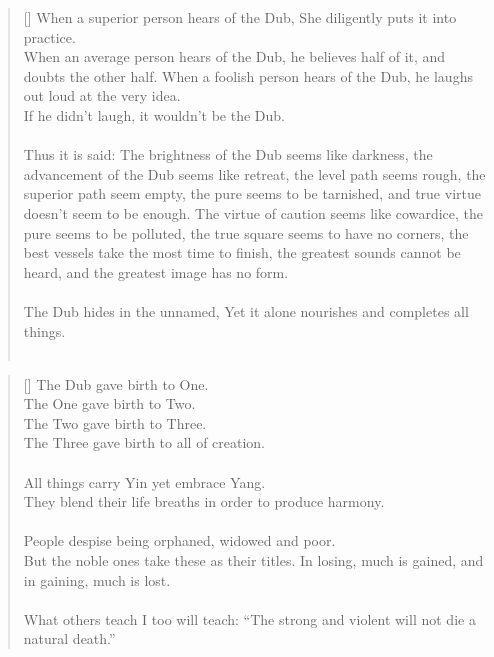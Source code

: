 \documentclass{article}
\begin{document}
\settowidth{\versewidth}{The Wizard leads byemptying people’s minds, filling their bellies, weakening their am- bitions, and making them become strong}
\begin{verse}[\versewidth]
When a superior person hears of the Dub, She diligently puts it into practice.\\
When an average person hears of the Dub, he believes half of it, and doubts the other half. 
When a foolish person hears of the Dub, he laughs out loud at the very idea.\\
If he didn't laugh, it wouldn't be the Dub.\\
\hfill\\
Thus it is said:
The brightness of the Dub seems like darkness, the advancement of the Dub seems like retreat, the level path seems rough, the superior path seem empty, the pure seems to be tarnished, and true virtue doesn't seem to be enough. The virtue of caution seems like cowardice, the pure seems to be polluted, the true square seems to have no corners, the best vessels take the most time to finish, the greatest sounds cannot be heard, and the greatest image has no form.\\
\hfill\\
The Dub hides in the unnamed, Yet it alone nourishes and completes all things.\\
\hfill\\
\end{verse}

\settowidth{\versewidth}{The Wizard leads byemptying people’s minds, filling their bellies, weakening their am- bitions, and making them become strong}
\begin{verse}[\versewidth]
The Dub gave birth to One.\\
The One gave birth to Two.\\
The Two gave birth to Three.\\
The Three gave birth to all of creation.\\
\hfill\\
All things carry Yin yet embrace Yang.\\
They blend their life breaths in order to produce harmony.\\
\hfill\\
People despise being orphaned, widowed and poor.\\
But the noble ones take these as their titles. 
In losing, much is gained, and in gaining, much is lost.\\
\hfill\\
What others teach I too will teach: 
``The strong and violent will not die a natural death.''

\end{verse}
\end{document}
